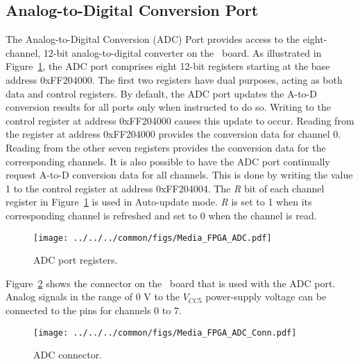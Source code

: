 \subsection{Analog-to-Digital Conversion Port}

\label{sec:ADC_port}

The Analog-to-Digital Conversion (ADC) Port provides access to the eight-channel, 12-bit
analog-to-digital converter on the \DEBoard~board. As illustrated in
Figure~\ref{fig:ADC_port}, the ADC port comprises eight 12-bit registers starting at the
base address {\sf 0xFF204000}. The first two registers have dual purposes, acting as both
data and control registers.  By default, the ADC port updates the A-to-D conversion
results for all ports only when instructed to do so. Writing to the control register at 
address {\sf 0xFF204000} causes this update to occur. Reading from the register at address
{\sf 0xFF204000} provides the conversion data for channel 0. Reading from the other seven
registers provides the conversion data for the corresponding channels. It is also
possible to have the ADC port continually request A-to-D conversion data for all channels.
This is done by writing the value 1 to the control register at address {\sf 0xFF204004}.
The {\it R} bit of each channel register in Figure~\ref{fig:ADC_port} is used in Auto-update mode.
{\it R} is set to 1 when its corresponding channel is refreshed and set to 0 when the channel is read.

\begin{figure}[h!]
   \begin{center}
       \texttt{[image: ../../../common/figs/Media\_FPGA\_ADC.pdf]}
   \end{center}
   \caption{ADC port registers.}
	\label{fig:ADC_port}
\end{figure}

Figure~\ref{fig:ADC_conn} shows the connector on the \DEBoard~board that is used with the
ADC port. Analog signals in the range of 0 V to the $V_{CC5}$ power-supply voltage can be 
connected to the pins for channels 0 to 7. 

\begin{figure}[h!]
   \begin{center}
       \texttt{[image: ../../../common/figs/Media\_FPGA\_ADC\_Conn.pdf]}
   \end{center}
   \caption{ADC connector.}
	\label{fig:ADC_conn}
\end{figure}


